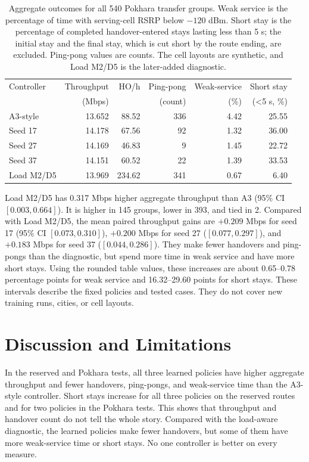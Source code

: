 \documentclass[fleqn,10pt,twoside]{IOEGC}
\begin{document}
\begin{table}[H]
  \caption{Aggregate outcomes for all 540 Pokhara transfer groups. Weak service is the percentage of time with serving-cell RSRP below $-120$ dBm. Short stay is the percentage of completed handover-entered stays lasting less than 5 s; the initial stay and the final stay, which is cut short by the route ending, are excluded. Ping-pong values are counts. The cell layouts are synthetic, and Load M2/D5 is the later-added diagnostic.}
  \label{tab:pokhara}
  \centering\scriptsize\setlength{\tabcolsep}{2.4pt}
  \begin{tabular}{lrrrrr}
    \toprule
    Controller & Throughput & HO/h & Ping-pong & Weak-service & Short stay \\
    & (Mbps) & & (count) & (\%) & (<5 s, \%) \\
    \midrule
    A3-style & 13.652 & 88.52 & 336 & 4.42 & 25.55 \\
    Seed 17 & 14.178 & 67.56 & 92 & 1.32 & 36.00 \\
    Seed 27 & 14.169 & 46.83 & 9 & 1.45 & 22.72 \\
    Seed 37 & 14.151 & 60.52 & 22 & 1.39 & 33.53 \\
    Load M2/D5 & 13.969 & 234.62 & 341 & 0.67 & 6.40 \\
    \bottomrule
  \end{tabular}
\end{table}

Load M2/D5 has 0.317 Mbps higher aggregate throughput than A3 (95\% CI $[0.003,0.664]$). It is higher in 145 groups, lower in 393, and tied in 2. Compared with Load M2/D5, the mean paired throughput gains are $+0.209$ Mbps for seed 17 (95\% CI $[0.073,0.310]$), $+0.200$ Mbps for seed 27 ($[0.077,0.297]$), and $+0.183$ Mbps for seed 37 ($[0.044,0.286]$). They make fewer handovers and ping-pongs than the diagnostic, but spend more time in weak service and have more short stays. Using the rounded table values, these increases are about 0.65--0.78 percentage points for weak service and 16.32--29.60 points for short stays. These intervals describe the fixed policies and tested cases. They do not cover new training runs, cities, or cell layouts.

\section{Discussion and Limitations}
In the reserved and Pokhara tests, all three learned policies have higher aggregate throughput and fewer handovers, ping-pongs, and weak-service time than the A3-style controller. Short stays increase for all three policies on the reserved routes and for two policies in the Pokhara tests. This shows that throughput and handover count do not tell the whole story. Compared with the load-aware diagnostic, the learned policies make fewer handovers, but some of them have more weak-service time or short stays. No one controller is better on every measure.
\end{document}
